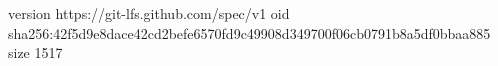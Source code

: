 version https://git-lfs.github.com/spec/v1
oid sha256:42f5d9e8dace42cd2befe6570fd9c49908d349700f06cb0791b8a5df0bbaa885
size 1517
